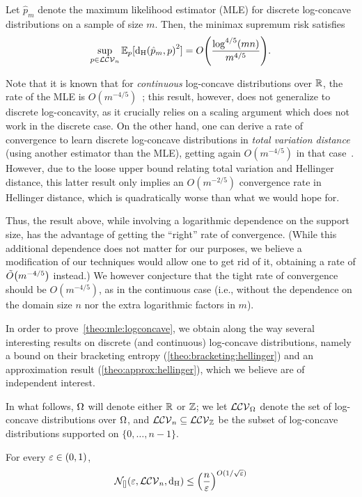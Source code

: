 \begin{theorem}\label{theo:mle:logconcave}
Let $\hat{p}_m$ denote the maximum likelihood estimator (MLE) for discrete log-concave distributions on a sample of size $m$. Then, the minimax supremum risk satisfies
\[
    \sup_{p\in\classlogconcave[n]}\shortexpect_p[ \hellinger{\hat{p}_m}{p}^2 ] = \bigO{ \frac{\log^{4/5} (mn)}{m^{4/5}} }.
\]
\end{theorem}

Note that it is known that for \emph{continuous} log-concave distributions over $\R$, the rate of the MLE is $O(m^{-4/5})$~\cite{KS:16}; this result, however, does not generalize to discrete log-concavity, as it crucially relies on a scaling argument which does not work in the discrete case. On the other hand, one can derive a rate of convergence to learn discrete log-concave distributions in \emph{total variation distance} (using another estimator than the MLE), getting again $O(m^{-4/5})$ in that case~\cite{DKS:16}. However, due to the loose upper bound relating total variation and Hellinger distance, this latter result only implies an $O(m^{-2/5})$ convergence rate in Hellinger distance, which is quadratically worse than what we would hope for.

Thus, the result above, while involving a logarithmic dependence on the support size, has the advantage of getting the ``right'' rate of convergence. (While this additional dependence does not matter for our purposes, we believe a modification of our techniques would allow one to get rid of it, obtaining a rate of $\tildeO{m^{-4/5}}$ instead.) We however conjecture that the tight rate of convergence should be $O(m^{-4/5})$, as in the continuous case (i.e., without the dependence on the domain size $n$ nor the extra logarithmic factors in $m$).

In order to prove~\cref{theo:mle:logconcave}, we obtain along the way several interesting results on discrete (and continuous) log-concave distributions, namely a bound on their bracketing entropy (\cref{theo:bracketing:hellinger}) and an approximation result (\cref{theo:approx:hellinger}), which we believe are of independent interest.\medskip

In what follows, $\domain$ will denote either $\R$ or $\Z$; we let $\classlogconcave[\domain]$ denote the set of log-concave distributions over $\domain$, and $\classlogconcave[n]\subseteq \classlogconcave[\Z]$ be the subset of log-concave distributions supported on $\{0,\dots,n-1\}$.
\begin{theorem}\label{theo:bracketing:hellinger}
  For every $\eps\in(0,1)$,
  \[
      \bracketing{\eps}{\classlogconcave[n]} \leq \left(\frac{n}{\eps}\right)^{O(1/\sqrt{\eps})}
  \]  
\end{theorem}

